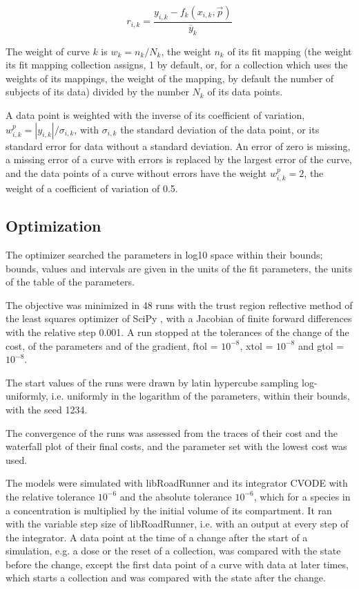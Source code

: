 \begin{equation}
r_{i,k} = \frac{y_{i,k} - f_k(x_{i,k}, \vec{p})}{\overline{y}_k}
\end{equation}

The weight of curve $k$ is $w_k = n_k / N_k$, the weight $n_k$ of its fit mapping (the weight its fit mapping collection assigns, 1 by default, or, for a collection which uses the weights of its mappings, the weight of the mapping, by default the number of subjects of its data) divided by the number $N_k$ of its data points.

A data point is weighted with the inverse of its coefficient of variation, $w^{p}_{i,k} = |y_{i,k}| / \sigma_{i,k}$, with $\sigma_{i,k}$ the standard deviation of the data point, or its standard error for data without a standard deviation. An error of zero is missing, a missing error of a curve with errors is replaced by the largest error of the curve, and the data points of a curve without errors have the weight $w^{p}_{i,k} = 2$, the weight of a coefficient of variation of 0.5.

\subsection{Optimization}

The optimizer searched the parameters in log10 space within their bounds; bounds, values and intervals are given in the units of the fit parameters, the units of the table of the parameters.

The objective was minimized in 48 runs with the trust region reflective method \cite{Branch1999} of the least squares optimizer of SciPy \cite{Virtanen2020}, with a Jacobian of finite forward differences with the relative step 0.001. A run stopped at the tolerances of the change of the cost, of the parameters and of the gradient, ftol = $10^{-8}$, xtol = $10^{-8}$ and gtol = $10^{-8}$.

The start values of the runs were drawn by latin hypercube sampling \cite{McKay1979} log-uniformly, i.e. uniformly in the logarithm of the parameters, within their bounds, with the seed 1234.

The convergence of the runs was assessed from the traces of their cost and the waterfall plot of their final costs, and the parameter set with the lowest cost was used.

The models were simulated with libRoadRunner \cite{Welsh2023} and its integrator CVODE \cite{Hindmarsh2005} with the relative tolerance $10^{-6}$ and the absolute tolerance $10^{-6}$, which for a species in a concentration is multiplied by the initial volume of its compartment. It ran with the variable step size of libRoadRunner, i.e. with an output at every step of the integrator. A data point at the time of a change after the start of a simulation, e.g. a dose or the reset of a collection, was compared with the state before the change, except the first data point of a curve with data at later times, which starts a collection and was compared with the state after the change.

